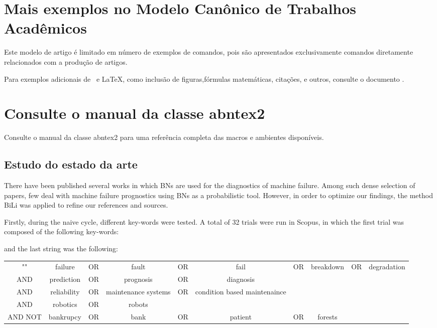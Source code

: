 \section{Mais exemplos no Modelo Canônico de Trabalhos Acadêmicos}

Este modelo de artigo é limitado em número de exemplos de comandos, pois são apresentados exclusivamente comandos diretamente relacionados com a produção de artigos.

Para exemplos adicionais de \abnTeX\ e \LaTeX, como inclusão de figuras,fórmulas matemáticas, citações, e outros, consulte o documento .

\section{Consulte o manual da classe \textsf{abntex2}}

Consulte o manual da classe \textsf{abntex2} \cite{abntex2classe} para uma referência completa das macros e ambientes disponíveis.

\subsection{Estudo do estado da arte}
There have been published several works in which BNs are used for the diagnostics of machine failure. Among such dense selection of papers, few deal with machine failure prognostics using BNs as a probabilistic tool. However, in order to optimize our findings, the method BiLi was applied to refine our references and sources.

Firstly, during the naive cycle, different key-words were tested. A total of 32 trials were run in Scopus, in which the first trial was composed of the following key-words:



and the last string was the following:

\begin{center}
    \begin{tabular}{ c c c c c c c c c c }
        "" & failure & OR & fault & OR & fail & OR & breakdown & OR & degradation \\
        AND & prediction & OR & prognosis & OR & diagnosis \\
        AND & reliability & OR & maintenance systems & OR & condition based maintenaince \\
        AND & robotics & OR & robots \\
        AND NOT & bankrupcy & OR & bank & OR & patient & OR & forests

    \end{tabular}
\end{center}

